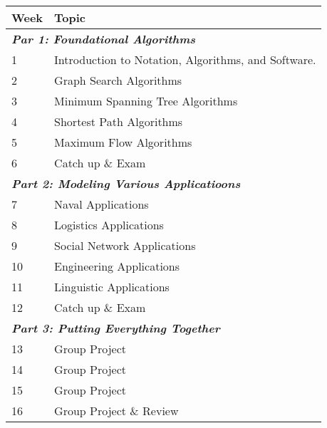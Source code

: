 \documentclass[12pt]{article}
\theoremstyle{definition}
\begin{document}
\renewcommand\arraystretch{1.5}
\begin{longtable}{ll}
Week \hspace{.2in} & Topic \\
\hline 
\multicolumn{2}{l}{\textbf{\textit{Par 1: Foundational Algorithms}}}\\
1 & Introduction to Notation, Algorithms, and Software.  \\
2 & Graph Search Algorithms \\
3 & Minimum Spanning Tree Algorithms\\ 
4 & Shortest Path Algorithms \\
5 & Maximum Flow Algorithms\\
6 & Catch up \& Exam \\
\multicolumn{2}{l}{\textbf{\textit{Part 2: Modeling Various Applicatioons}}}\\
7 & Naval Applications \\
8 & Logistics Applications \\
9 & Social Network Applications \\
10 & Engineering Applications \\
11 & Linguistic Applications \\
12 & Catch up \& Exam \\
\multicolumn{2}{l}{\textbf{\textit{Part 3: Putting Everything Together}}}\\
13 & Group Project \\
14 & Group Project \\
15 & Group Project \\
16 & Group Project \& Review \\
\end{longtable}
\end{document}
